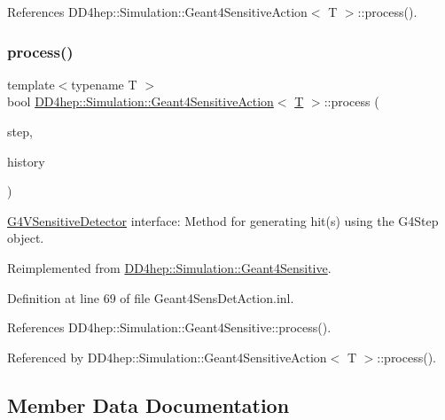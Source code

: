 References D\+D4hep\+::\+Simulation\+::\+Geant4\+Sensitive\+Action$<$ T $>$\+::process().

\hypertarget{class_d_d4hep_1_1_simulation_1_1_geant4_sensitive_action_a36759982ed0876a5ce81c14973c18077}{}\label{class_d_d4hep_1_1_simulation_1_1_geant4_sensitive_action_a36759982ed0876a5ce81c14973c18077} 
\subsubsection{\texorpdfstring{process()}{process()}\hspace{0.1cm}{\footnotesize\ttfamily [7/7]}}
{\footnotesize\ttfamily template$<$typename T $>$ \\
bool \hyperlink{class_d_d4hep_1_1_simulation_1_1_geant4_sensitive_action}{D\+D4hep\+::\+Simulation\+::\+Geant4\+Sensitive\+Action}$<$ \hyperlink{class_t}{T} $>$\+::process (\begin{DoxyParamCaption}\item[{G4\+Step $\ast$}]{step,  }\item[{G4\+Touchable\+History $\ast$}]{history }\end{DoxyParamCaption})\hspace{0.3cm}{\ttfamily [virtual]}}



\hyperlink{class_g4_v_sensitive_detector}{G4\+V\+Sensitive\+Detector} interface\+: Method for generating hit(s) using the G4\+Step object. 



Reimplemented from \hyperlink{class_d_d4hep_1_1_simulation_1_1_geant4_sensitive_a9a9463a6c29a66dad43a52ffc9f7838d}{D\+D4hep\+::\+Simulation\+::\+Geant4\+Sensitive}.



Definition at line 69 of file Geant4\+Sens\+Det\+Action.\+inl.



References D\+D4hep\+::\+Simulation\+::\+Geant4\+Sensitive\+::process().



Referenced by D\+D4hep\+::\+Simulation\+::\+Geant4\+Sensitive\+Action$<$ T $>$\+::process().



\subsection{Member Data Documentation}
\hypertarget{class_d_d4hep_1_1_simulation_1_1_geant4_sensitive_action_aa73c450b64116d4e52be7accbef7bea9}{}\label{class_d_d4hep_1_1_simulation_1_1_geant4_sensitive_action_aa73c450b64116d4e52be7accbef7bea9} 
